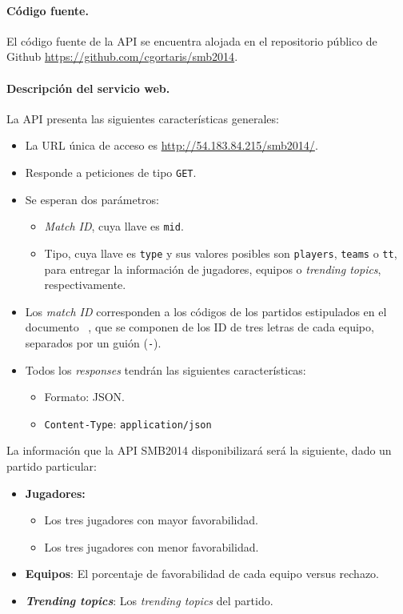 \documentclass[11pt,spanish]{article}
\begin{document}
\paragraph{Código fuente.}
El código fuente de la API se encuentra alojada en el repositorio público de Github \url{https://github.com/cgortaris/smb2014}.

\paragraph{Descripción del servicio web.}
La API presenta las siguientes características generales:
\begin{itemize}
    \item La URL única de acceso es \url{http://54.183.84.215/smb2014/}.
    \item Responde  a peticiones de tipo \texttt{GET}.
    \item Se esperan dos parámetros:
    \begin{itemize}
        \item \emph{Match ID}, cuya llave es \texttt{mid}.
        \item Tipo, cuya llave es \texttt{type} y sus valores posibles son \texttt{players}, \texttt{teams} o \texttt{tt}, para entregar la información de jugadores, equipos o \emph{trending topics}, respectivamente.
    \end{itemize}
    \item Los \emph{match ID} corresponden a los códigos de los partidos estipulados en el documento ~\cite{fifa}, que se componen de los ID de tres letras de cada equipo, separados por un guión (\texttt{-}).
    \item Todos los \emph{responses} tendrán las siguientes características:
    \begin{itemize}
        \item Formato: JSON.
        \item \texttt{Content-Type}: \texttt{application/json}
    \end{itemize}
\end{itemize}

La información que la API SMB2014 disponibilizará será la siguiente, dado un partido particular:
\begin{itemize}
\item \textbf{Jugadores:} 
    \begin{itemize}
    \item Los tres jugadores con mayor favorabilidad.
    \item Los tres jugadores con menor favorabilidad.   
    \end{itemize}
\item \textbf{Equipos}: El porcentaje de favorabilidad de cada equipo versus rechazo.
\item \textbf{\emph{Trending topics}}: Los \emph{trending topics} del partido.
\end{itemize}
\end{document}
